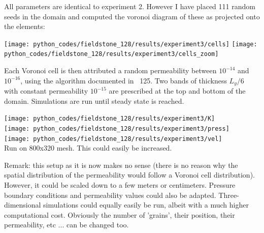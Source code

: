 All parameters are identical to experiment 2. However I have placed
111 random seeds in the domain and computed the voronoi diagram of these 
as projected onto the elements:

\begin{center}
\texttt{[image: python\_codes/fieldstone\_128/results/experiment3/cells]}
\texttt{[image: python\_codes/fieldstone\_128/results/experiment3/cells\_zoom]}
\end{center}

Each Voronoi cell is then 
attributed a random permeability between $10^{-14}$ and $10^{-16}$, 
using the algorithm documented in \stone~125.
Two bands of thickness $L_y/6$ with constant permeability $10^{-15}$ are 
prescribed at the top and bottom of the domain.
Simulations are run until steady state is reached. 

\begin{center}
\texttt{[image: python\_codes/fieldstone\_128/results/experiment3/K]}\\
\texttt{[image: python\_codes/fieldstone\_128/results/experiment3/press]}\\
\texttt{[image: python\_codes/fieldstone\_128/results/experiment3/vel]}\\
{\captionfont Run on 800x320 mesh. This could easily be increased.} 
\end{center}

Remark: this setup as it is now makes no sense (there is no reason why the 
spatial distribution of the permeability would follow a Voronoi cell 
distribution). However, it could be scaled down to a few meters or
centimeters. Pressure boundary conditions and permeability values could also be adapted.
Three-dimensional simulations could equally easily be run, albeit with a much higher
computational cost. 
Obviously the number of 'grains', their position, their permeability, etc ... can be 
changed too.


